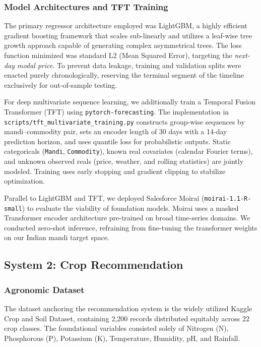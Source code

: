 \documentclass[conference]{IEEEtran}
\begin{document}
\subsubsection{Model Architectures and TFT Training}
The primary regressor architecture employed was LightGBM, a highly efficient gradient boosting framework that scales sub-linearly and utilizes a leaf-wise tree growth approach capable of generating complex asymmetrical trees. The loss function minimized was standard L2 (Mean Squared Error), targeting the \emph{next-day modal price}. To prevent data leakage, training and validation splits were enacted purely chronologically, reserving the terminal segment of the timeline exclusively for out-of-sample testing.

For deep multivariate sequence learning, we additionally train a Temporal Fusion Transformer (TFT) using \texttt{pytorch-forecasting}. The implementation in \texttt{scripts/tft\_multivariate\_training.py} constructs group-wise sequences by mandi--commodity pair, sets an encoder length of 30 days with a 14-day prediction horizon, and uses quantile loss for probabilistic outputs. Static categoricals (\texttt{Mandi}, \texttt{Commodity}), known real covariates (calendar Fourier terms), and unknown observed reals (price, weather, and rolling statistics) are jointly modeled. Training uses early stopping and gradient clipping to stabilize optimization.

Parallel to LightGBM and TFT, we deployed Salesforce Moirai (\texttt{moirai-1.1-R-small}) to evaluate the viability of foundation models. Moirai uses a masked Transformer encoder architecture pre-trained on broad time-series domains. We conducted zero-shot inference, refraining from fine-tuning the transformer weights on our Indian mandi target space.

\subsection{System 2: Crop Recommendation}

\subsubsection{Agronomic Dataset}
The dataset anchoring the recommendation system is the widely utilized Kaggle Crop and Soil Dataset, containing 2,200 records distributed equitably across 22 crop classes. The foundational variables consisted solely of Nitrogen (N), Phosphorous (P), Potassium (K), Temperature, Humidity, pH, and Rainfall.
\end{document}
